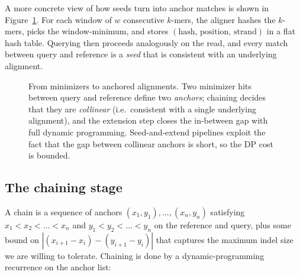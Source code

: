 A more concrete view of how seeds turn into anchor matches is shown
in Figure~\ref{fig:seed-extend-detail}. For each window of $w$
consecutive $k$-mers, the aligner hashes the $k$-mers, picks the
window-minimum, and stores
$(\text{hash},\, \text{position},\, \text{strand})$ in a flat hash
table. Querying then proceeds analogously on the read, and every
match between query and reference is a \emph{seed} that is consistent
with an underlying alignment.

\begin{figure}[ht]
  \centering
  \caption{From minimizers to anchored alignments. Two minimizer hits
    between query and reference define two \emph{anchors}; chaining
    decides that they are \emph{collinear} (i.e.\ consistent with a
    single underlying alignment), and the extension step closes the
    in-between gap with full dynamic programming. Seed-and-extend
    pipelines exploit the fact that the gap between collinear anchors
    is short, so the DP cost is bounded.}
  \label{fig:seed-extend-detail}
\end{figure}

\subsection{The chaining stage}

A chain is a sequence of anchors $(x_1, y_1), \ldots, (x_n, y_n)$
satisfying $x_1 < x_2 < \ldots < x_n$ and $y_1 < y_2 < \ldots < y_n$
on the reference and query, plus some bound on
$|(x_{i+1} - x_i) - (y_{i+1} - y_i)|$ that captures the maximum
indel size we are willing to tolerate. Chaining is done by a
dynamic-programming recurrence on the anchor list:

